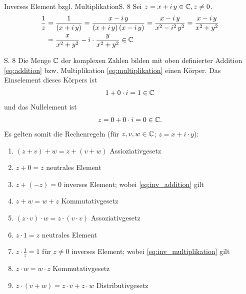 \begin{bemerkung}{Inverses Element bzgl. Multiplikation}{S. 8}
  Sei $z = x + i \, y \in \mathbb{C}, z \neq 0$.
  \begin{align}
    \label{eq:inv_multiplikation}
    \frac{1}{z}
      &= \frac{1}{(x + i \, y)}
       = \frac{x - i \, y}{(x + i \, y) \, (x - i \, y)}
       = \frac{x - i \, y}{x^2 - i^2 \, y^2}
       = \frac{x - i \, y}{x^2 + y^2}
        \notag\\
      &= \frac{x}{x^2 + y^2} - i \cdot \frac{y}{x^2 + y^2} \in \mathbb{C}
  \end{align}
\end{bemerkung}

\begin{satz}{S. 8}
  Die Menge $\mathbb{C}$ der komplexen Zahlen bilden mit oben definierter Addition \eqref{eq:addition} bzw. Multiplikation \eqref{eq:multiplikation} einen Körper.
  Das Einselement dieses Körpers ist
  \begin{align}
    1 + 0 \cdot i = 1 \in \mathbb{C}
  \end{align}
  und das Nullelement ist
  \begin{align}
    z = 0 + 0 \cdot i = 0 \in \mathbb{C} .
  \end{align}
  Es gelten somit die Rechenregeln (für $z, v, w \in \mathbb{C}$; $z = x + i \cdot y$):
  \newcommand{\tabone}{39mm}
  \begin{enumerate}[label=\alph*)]
    \item $(z + v) + w = z + (v + w)$ \tabto{\tabone} Assioziativgesetz
    \item $z + 0 = z$ \tabto{\tabone} neutrales Element
    \item $z + (-z) = 0$ \tabto{\tabone} inverses Element; wobei \eqref{eq:inv_addition} gilt
    \item $z + w = w + z$ \tabto{\tabone} Kommutativgesetz
    \item $(z \cdot v) \cdot w = z \cdot (v \cdot v)$ \tabto{\tabone} Assoziativgesetz
    \item $z \cdot 1 = z$ \tabto{\tabone}  neutrales Element
    \item $\displaystyle z \cdot \frac{1}{z} = 1$ für $z \neq 0$ \tabto{\tabone} inverses Element; wobei \eqref{eq:inv_multiplikation} gilt
    \item $z \cdot w = w \cdot z$ \tabto{\tabone} Kommutativgesetz
    \item $z \cdot (v + w) = z \cdot v + z \cdot w$ \tabto{\tabone} Distributivgesetz
  \end{enumerate}
\end{satz}

